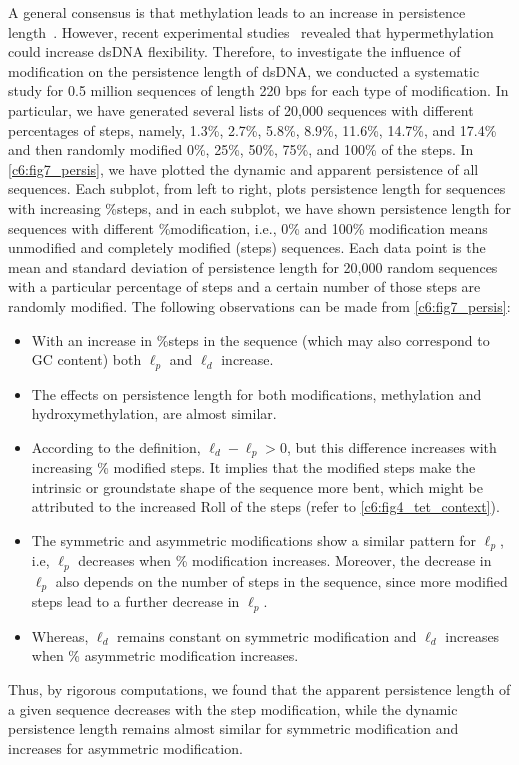 A general consensus is that methylation leads to an increase in persistence length~\cite{hagerman1988flexibility,severin2011cytosine,perez2012impact,banyay2002structural}.
However, recent experimental studies~\cite{pongor2017optical,shon2019submicrometer} revealed that hypermethylation could increase dsDNA flexibility.
Therefore, to investigate the influence of \cpg modification on the persistence length of dsDNA, we conducted a systematic study for 0.5 million sequences of length 220 bps for each type of \cpg modification.
In particular, we have generated several lists of 20,000 sequences with different percentages of \cpg steps, namely, 1.3\%, 2.7\%, 5.8\%, 8.9\%, 11.6\%, 14.7\%, and 17.4\% and then randomly modified 0\%, 25\%, 50\%, 75\%, and 100\% of the \cpg steps.
In \cref{c6:fig7_persis}, we have plotted the dynamic and apparent persistence of all sequences.
Each subplot, from left to right, plots persistence length for sequences with increasing \%\cpg steps, and in each subplot, we have shown persistence length for sequences with different \%\cpg modification, i.e., 0\% and 100\% \cpg modification means unmodified and completely modified (\cpg steps) sequences.
Each data point is the mean and standard deviation of persistence length for 20,000 random sequences with a particular percentage of \cpg steps and a certain number of those \cpg steps are randomly modified.
The following observations can be made from \cref{c6:fig7_persis}:
\begin{itemize}
\item With an increase in \%\cpg steps in the sequence (which may also correspond to GC content) both $\ell_{p}$ and $\ell_{d}$ increase. 
\item The effects on persistence length for both modifications, methylation and hydroxymethylation, are almost similar.
\item According to the definition, $\ell_{d}-\ell_{p}>0$, but this difference increases with increasing \% modified \cpg steps. 
It implies that the modified \cpg steps make the intrinsic or groundstate shape of the sequence more bent, which might be attributed to the increased Roll of the \cpg steps (refer to \cref{c6:fig4_tet_context}).
\item The symmetric and asymmetric modifications show a similar pattern  for $\ell_{p}$, i.e, $\ell_{p}$ decreases when \% modification increases.  
Moreover, the decrease in $\ell_{p}$ also depends on the number of \cpg steps in the sequence, since more modified \cpg steps lead to a further decrease in $\ell_{p}$.
\item Whereas, $\ell_{d}$ remains constant on symmetric modification and $\ell_{d}$ increases when \% asymmetric modification increases. 
\end{itemize}
Thus, by rigorous computations, we found that the apparent persistence length of a given sequence decreases with the \cpg step modification, while the dynamic persistence length remains almost similar for symmetric modification and increases for asymmetric modification.